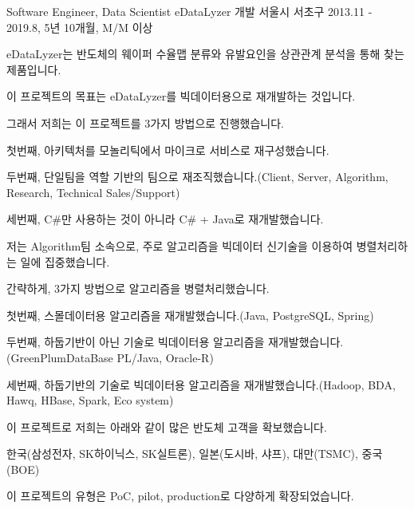 

\begin{cventries}

  \cventry
    {Software Engineer, Data Scientist} %
    {eDataLyzer 개발} %
    {서울시 서초구} %
    {2013.11 - 2019.8, 5년 10개월, M/M 이상} %
    {
      \begin{cvitems} %
        \item {eDataLyzer는 반도체의 웨이퍼 수율맵 분류와 유발요인을 상관관계 분석을 통해 찾는 제품입니다.}
        \item {이 프로젝트의 목표는 eDataLyzer를 빅데이터용으로 재개발하는 것입니다.}
        \item {그래서 저희는 이 프로젝트를 3가지 방법으로 진행했습니다.}
        \item {첫번째, 아키텍처를 모놀리틱에서 마이크로 서비스로 재구성했습니다.}
        \item {두번째, 단일팀을 역할 기반의 팀으로 재조직했습니다.(Client, Server, Algorithm, Research, Technical Sales/Support)}
        \item {세번째, C\#만 사용하는 것이 아니라 C\# + Java로 재개발했습니다.}
        \item {저는 Algorithm팀 소속으로, 주로 알고리즘을 빅데이터 신기술을 이용하여 병렬처리하는 일에 집중했습니다.}
        \item {간략하게, 3가지 방법으로 알고리즘을 병렬처리했습니다.}
        \item {첫번째, 스몰데이터용 알고리즘을 재개발했습니다.(Java, PostgreSQL, Spring)}
        \item {두번째, 하둡기반이 아닌 기술로 빅데이터용 알고리즘을 재개발했습니다.(GreenPlumDataBase PL/Java, Oracle-R)}
        \item {세번째, 하둡기반의 기술로 빅데이터용 알고리즘을 재개발했습니다.(Hadoop, BDA, Hawq, HBase, Spark, Eco system)}
        \item {이 프로젝트로 저희는 아래와 같이 많은 반도체 고객을 확보했습니다.}
        \item {한국(삼성전자, SK하이닉스, SK실트론), 일본(도시바, 샤프), 대만(TSMC), 중국(BOE)}
        \item {이 프로젝트의 유형은 PoC, pilot, production로 다양하게 확장되었습니다.}
      \end{cvitems}
    }


\end{cventries}
